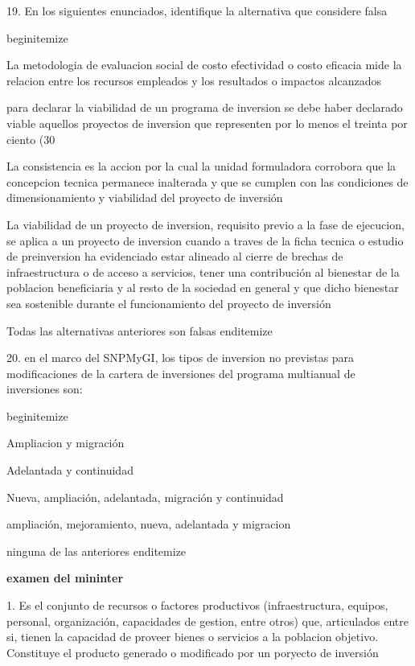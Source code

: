 19. En los siguientes enunciados, identifique la alternativa que considere falsa

begin{itemize}
			\item La metodologia de evaluacion social de costo efectividad o costo eficacia mide la relacion entre los recursos empleados y los resultados o impactos alcanzados
 			\item para declarar la viabilidad de un programa de inversion se debe haber declarado viable aquellos proyectos de inversion que representen por lo menos el treinta por ciento (30%
			\item La consistencia es la accion por la cual la unidad formuladora corrobora que la concepcion tecnica permanece inalterada y que se cumplen con las condiciones de dimensionamiento y viabilidad del proyecto de inversión 
			\item La viabilidad de un proyecto de inversion, requisito previo a la fase de ejecucion, se aplica a un proyecto de inversion cuando a traves de la ficha tecnica o estudio de preinversion ha evidenciado estar alineado al cierre de brechas de infraestructura o de acceso a servicios, tener una contribución al bienestar de la poblacion beneficiaria y al resto de la sociedad en general y que dicho bienestar sea sostenible durante el funcionamiento del proyecto de inversión 
			\item Todas las alternativas anteriores son falsas
end{itemize}

20. en el marco del SNPMyGI, los tipos de inversion no previstas para modificaciones de la cartera de inversiones del programa multianual de inversiones son:

begin{itemize}
			\item Ampliacion y migración 
 			\item Adelantada y continuidad
			\item Nueva, ampliación, adelantada, migración y continuidad
			\item ampliación, mejoramiento, nueva, adelantada y migracion
			\item ninguna de las anteriores 
end{itemize}


\textbf{examen del mininter}

1. Es el conjunto de recursos o factores productivos (infraestructura, equipos, personal, organización,  capacidades de gestion, entre otros) que, articulados entre si, tienen la capacidad de proveer bienes o servicios a la poblacion objetivo. Constituye el producto generado o modificado por un poryecto de inversión 

